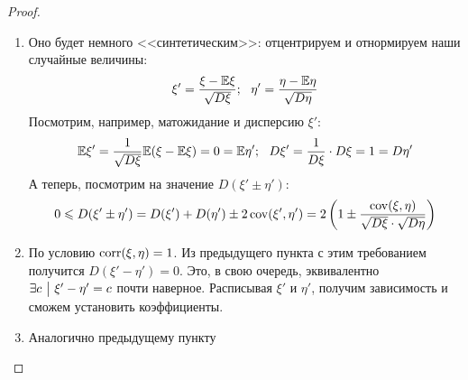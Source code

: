 \begin{proof}~
	\begin{enumerate}
		\item Оно будет немного <<синтетическим>>: отцентрируем и отнормируем наши случайные величины:
		\[
			\xi' = \frac{\xi - \mathbb{E}\xi}{\sqrt{D\xi}};\ \ \eta' = \frac{\eta - \mathbb{E}\eta}{\sqrt{D\eta}}
		\]
		Посмотрим, например, матожидание и дисперсию $\xi'$:
		\[
			\mathbb{E}\xi' = \frac{1}{\sqrt{D\xi}}\mathbb{E}(\xi - \mathbb{E}\xi) = 0 = \mathbb{E}\eta';\ \ D\xi' = \frac{1}{D\xi} \cdot D\xi = 1 = D\eta'
		\]
		А теперь, посмотрим на значение $D(\xi' \pm \eta')$:
		\[
			0 \leqslant D(\xi' \pm \eta') = D(\xi') + D(\eta') \pm 2\operatorname{cov}(\xi', \eta') = 2\left(1 \pm \frac{\operatorname{cov}(\xi, \eta)}{\sqrt{D\xi} \cdot \sqrt{D\eta}}\right)
		\]
		
		\item По условию $\operatorname{corr}(\xi, \eta) = 1$. Из предыдущего пункта с этим требованием получится $D(\xi' - \eta') = 0$. Это, в свою очередь, эквивалентно $\exists c \ \big|\  \xi' - \eta' = c$ почти наверное. Расписывая $\xi'$ и $\eta'$, получим зависимость и сможем установить коэффициенты.
		
		\item Аналогично предыдущему пункту
	\end{enumerate}
\end{proof}